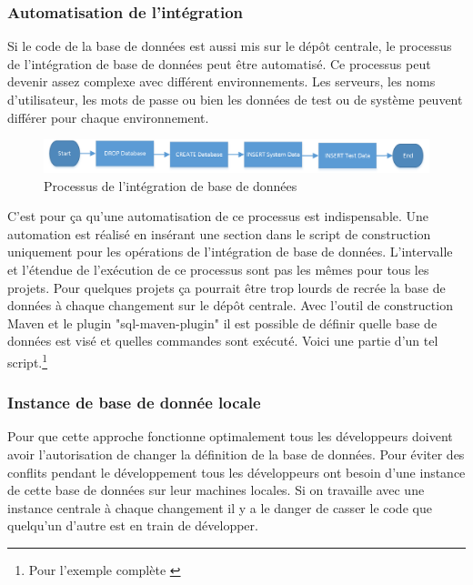 \subsubsection{Automatisation de l'intégration}
Si le code de la base de données est aussi mis sur le dépôt centrale, le processus de l'intégration de base de données peut être automatisé. Ce processus peut devenir assez complexe avec différent environnements. Les serveurs, les noms d'utilisateur, les mots de passe ou bien les données de test ou de système peuvent différer pour chaque environnement.
\begin{figure}[H]
	\centering
		\includegraphics[scale=1]{bilder/database_integration}
	\caption{Processus de l'intégration de base de données}
	\label{fig:processus}
\end{figure}

C'est pour ça qu'une automatisation de ce processus est indispensable. Une automation est réalisé en insérant une section dans le script de construction uniquement pour les opérations de l'intégration de base de données. L'intervalle et l'étendue de l'exécution de ce processus sont pas les mêmes pour tous les projets. Pour quelques projets ça pourrait être trop lourds de recrée la base de données à chaque changement sur le dépôt centrale. Avec l'outil de construction Maven et le plugin "sql-maven-plugin" il est possible de définir quelle base de données est visé et quelles commandes sont exécuté. Voici une partie d'un tel script.\footnote{Pour l'exemple complète \cite{mvnsql}}



\subsubsection{Instance de base de donnée locale}

Pour que cette approche fonctionne optimalement tous les développeurs doivent avoir l'autorisation de changer la définition de la base de données. Pour éviter des conflits pendant le développement tous les développeurs ont besoin d'une instance de cette base de données sur leur machines locales. Si on travaille avec une instance centrale à chaque changement il y a le danger de casser le code que quelqu'un d'autre est en train de développer.
\newpage


